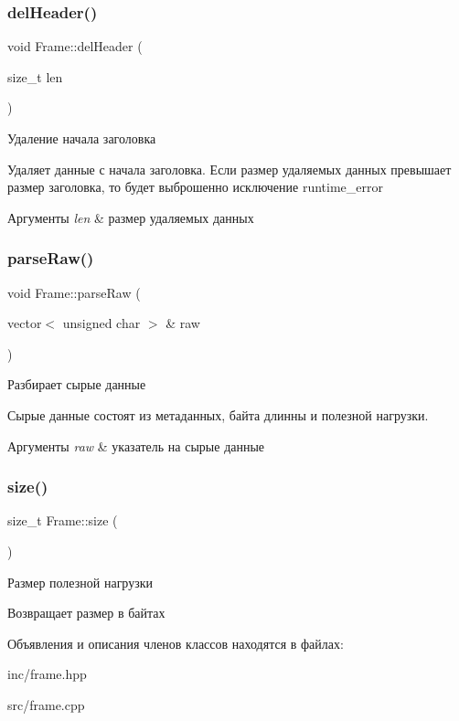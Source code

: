 \subsubsection{\texorpdfstring{del\+Header()}{delHeader()}}
{\footnotesize\ttfamily void Frame\+::del\+Header (\begin{DoxyParamCaption}\item[{size\+\_\+t}]{len }\end{DoxyParamCaption})}



Удаление начала заголовка 

Удаляет данные с начала заголовка. Если размер удаляемых данных превышает размер заголовка, то будет выброшенно исключение runtime\+\_\+error 
\begin{DoxyParams}{Аргументы}
{\em len} & размер удаляемых данных \\
\hline
\end{DoxyParams}
\mbox{\label{classFrame_a47a5ecad8d5d88037796906e0e515c7f}} 
\subsubsection{\texorpdfstring{parse\+Raw()}{parseRaw()}}
{\footnotesize\ttfamily void Frame\+::parse\+Raw (\begin{DoxyParamCaption}\item[{vector$<$ unsigned char $>$ \&}]{raw }\end{DoxyParamCaption})}



Разбирает сырые данные 

Сырые данные состоят из метаданных, байта длинны и полезной нагрузки. 
\begin{DoxyParams}{Аргументы}
{\em raw} & указатель на сырые данные \\
\hline
\end{DoxyParams}
\mbox{\label{classFrame_a451c2d259d060e8d0467378cc8eaa640}} 
\subsubsection{\texorpdfstring{size()}{size()}}
{\footnotesize\ttfamily size\+\_\+t Frame\+::size (\begin{DoxyParamCaption}{ }\end{DoxyParamCaption})}



Размер полезной нагрузки 

\begin{DoxyReturn}{Возвращает}
размер в байтах 
\end{DoxyReturn}


Объявления и описания членов классов находятся в файлах\+:\begin{DoxyCompactItemize}
\item 
inc/frame.\+hpp\item 
src/frame.\+cpp\end{DoxyCompactItemize}

